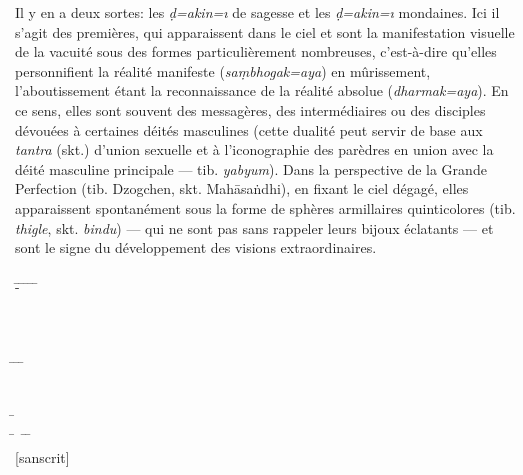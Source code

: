 \begin{tabbing}
{{  Il y en a deux sortes: les \emph{\d{d}\a={a}kin\a={\i}} de sagesse et les
  \emph{\d{d}\a={a}kin\a={\i}} mondaines. Ici il s'agit des premières,
  qui apparaissent dans le ciel et sont la manifestation visuelle de
  la vacuité sous des formes particulièrement nombreuses, c'est-à-dire
  qu'elles personnifient la réalité manifeste
  (\emph{sa\d{m}bhogak\a={a}ya}) en mûrissement, l'aboutissement
  étant la reconnaissance de la réalité absolue
  (\emph{dharmak\a={a}ya}). En ce sens, elles sont souvent des
  messagères, des intermédiaires ou des disciples dévouées à certaines
  déités masculines (cette dualité peut servir de base aux
  \emph{tantra} (skt.) d'union sexuelle et à l'iconographie des
  parèdres en union avec la déité masculine
  principale --- tib. \emph{yabyum}). Dans la perspective de la Grande
  Perfection (tib. Dzogchen, skt. Mah\={a}sa\.{n}dhi), en fixant le
  ciel dégagé, elles
  apparaissent spontanément sous la forme de sphères armillaires
  quinticolores (tib. \emph{thigle}, skt. \emph{bindu}) --- qui ne sont
  pas sans rappeler leurs bijoux éclatants --- et sont le signe du
  développement des visions extraordinaires.}}\\
\>\\
\>-\= \= \= \=
\=\\
\> \> \> \> \>
\>\\
\>\\
\>\\
\> \quad\qquad \= \=
\=\\
\> \> \>
\>\\
\>
\end{tabbing}

\bigskip


\begin{tabbing}
\=\\
\> \= \ \= \quad \=\\
\> \> \>
\> \quad \textsf{[sanscrit]}\\
\> \> \>
\>\\
\>
\end{tabbing}

